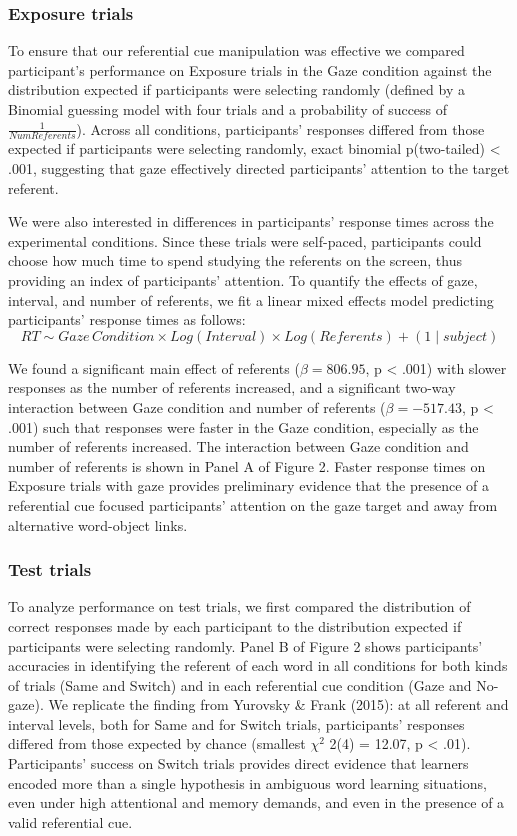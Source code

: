 \documentclass[a4paper,man,floatsintext]{apa6}
\begin{document}
\subsubsection{Exposure trials}\label{exposure-trials}

To ensure that our referential cue manipulation was effective we
compared participant's performance on Exposure trials in the Gaze
condition against the distribution expected if participants were
selecting randomly (defined by a Binomial guessing model with four
trials and a probability of success of \(\frac{1}{Num Referents}\)).
Across all conditions, participants' responses differed from those
expected if participants were selecting randomly, exact binomial
p(two-tailed) \textless{} .001, suggesting that gaze effectively
directed participants' attention to the target referent.

We were also interested in differences in participants' response times
across the experimental conditions. Since these trials were self-paced,
participants could choose how much time to spend studying the referents
on the screen, thus providing an index of participants' attention. To
quantify the effects of gaze, interval, and number of referents, we fit
a linear mixed effects model predicting participants' response times as
follows:
\[RT \sim Gaze \, Condition \times Log(Interval) \times Log(Referents) + (1 \mid subject)\]

\noindent We found a significant main effect of referents
(\(\beta = 806.95\), p \textless{} .001) with slower responses as the
number of referents increased, and a significant two-way interaction
between Gaze condition and number of referents (\(\beta = -517.43\), p
\textless{} .001) such that responses were faster in the Gaze condition,
especially as the number of referents increased. The interaction between
Gaze condition and number of referents is shown in Panel A of Figure 2.
Faster response times on Exposure trials with gaze provides preliminary
evidence that the presence of a referential cue focused participants'
attention on the gaze target and away from alternative word-object
links.

\subsubsection{Test trials}\label{test-trials}

To analyze performance on test trials, we first compared the
distribution of correct responses made by each participant to the
distribution expected if participants were selecting randomly. Panel B
of Figure 2 shows participants' accuracies in identifying the referent
of each word in all conditions for both kinds of trials (Same and
Switch) and in each referential cue condition (Gaze and No-gaze). We
replicate the finding from Yurovsky \& Frank (2015): at all referent and
interval levels, both for Same and for Switch trials, participants'
responses differed from those expected by chance (smallest \(\chi^2\)
2(4) = 12.07, p \textless{} .01). Participants' success on Switch trials
provides direct evidence that learners encoded more than a single
hypothesis in ambiguous word learning situations, even under high
attentional and memory demands, and even in the presence of a valid
referential cue.
\end{document}
